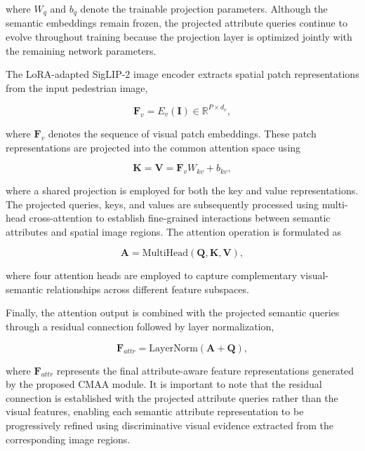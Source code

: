 \documentclass{ieeeaccess}
\begin{document}
where $W_q$ and $b_q$ denote the trainable projection parameters. Although the semantic embeddings remain frozen, the projected attribute queries continue to evolve throughout training because the projection layer is optimized jointly with the remaining network parameters.

The LoRA-adapted SigLIP-2 image encoder extracts spatial patch representations from the input pedestrian image,

\begin{equation}
\mathbf{F}_v
=
E_v(\mathbf{I})
\in
\mathbb{R}^{P\times d_v},
\label{eq:visual_patch}
\end{equation}

where $\mathbf{F}_v$ denotes the sequence of visual patch embeddings. These patch representations are projected into the common attention space using

\begin{equation}
\mathbf{K}
=
\mathbf{V}
=
\mathbf{F}_vW_{kv}+b_{kv},
\label{eq:kv_projection}
\end{equation}

where a shared projection is employed for both the key and value representations. The projected queries, keys, and values are subsequently processed using multi-head cross-attention to establish fine-grained interactions between semantic attributes and spatial image regions. The attention operation is formulated as

\begin{equation}
\mathbf{A}
=
\mathrm{MultiHead}
(\mathbf{Q},\mathbf{K},\mathbf{V}),
\label{eq:cross_attention}
\end{equation}

where four attention heads are employed to capture complementary visual-semantic relationships across different feature subspaces.

Finally, the attention output is combined with the projected semantic queries through a residual connection followed by layer normalization,

\begin{equation}
\mathbf{F}_{attr}
=
\mathrm{LayerNorm}
(\mathbf{A}+\mathbf{Q}),
\label{eq:cmaa_output}
\end{equation}

where $\mathbf{F}_{attr}$ represents the final attribute-aware feature representations generated by the proposed CMAA module. It is important to note that the residual connection is established with the projected attribute queries rather than the visual features, enabling each semantic attribute representation to be progressively refined using discriminative visual evidence extracted from the corresponding image regions.
\end{document}
